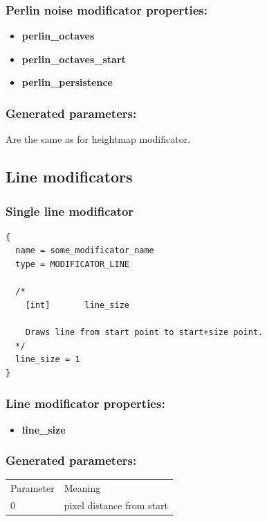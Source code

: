 \documentclass[9pt]{article}
\begin{document}
\subsubsection*{Perlin noise modificator properties:}
\begin{itemize}
\item{\bf perlin\_octaves}
\item{\bf perlin\_octaves\_start}
\item{\bf perlin\_persistence}
\end{itemize}

\subsubsection*{Generated parameters:}
Are the same as for heightmap modificator.

\subsection{Line modificators}
\subsubsection{Single line modificator}

\begin{verbatim}
{
  name = some_modificator_name
  type = MODIFICATOR_LINE

  /*
    [int]       line_size
    
    Draws line from start point to start+size point.
  */
  line_size = 1
}
\end{verbatim}
\subsubsection*{Line modificator properties:}
\begin{itemize}
\item{\bf line\_size}
\end{itemize}

\subsubsection*{Generated parameters:}

\begin{tabular}{|l||l|}
  Parameter & Meaning \\
  0 & pixel distance from start \\
\end{tabular}
\end{document}
